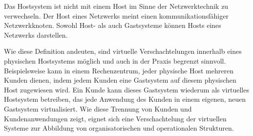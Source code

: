 \documentclass[../main.tex]{subfiles}
\begin{document}



		Das Hostsystem ist nicht mit einem Host im Sinne der Netzwerktechnik zu verwechseln. Der Host eines Netzwerks meint einen kommunikationsfähiger Netzwerkknoten. Sowohl Host- als auch Gastsysteme können Hosts eines Netzwerks darstellen.





		Wie diese Definition andeuten, sind virtuelle Verschachtelungen innerhalb eines physischen Hostsystems möglich und auch in der Praxis begrenzt sinnvoll. Beispielsweise kann in einem Rechenzentrum, jeder physische Host mehreren Kunden dienen, indem jedem Kunden eine Gastsystem auf diesem physischen Host zugewiesen wird. Ein Kunde kann dieses Gastsystem wiederum als virtuelles Hostsystem betreiben, das jede Anwendung des Kunden in einem eigenen, neuen Gastsystem virtualisiert. Wie diese Trennung von Kunden und Kundenanwendungen zeigt, eignet sich eine Verschachtelung der virtuellen Systeme zur Abbildung von organisatorischen und operationalen Strukturen.
\end{document}
